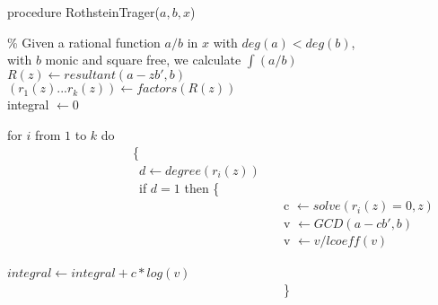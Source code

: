 \begin{flushleft}
procedure RothsteinTrager($a,b,x$)

\% Given a rational function $a/b$ in $x$ with $deg(a)<deg(b)$, \\
with $b$ monic and square free, we calculate $\int(a/b)$ \\
$R(z) \leftarrow resultant(a-zb',b)$ \\
$(r_{1}(z)...r_{k}(z)) \leftarrow factors(R(z))$ \\
integral $\leftarrow 0$

for $i$ from $1$ to $k$ do \\
~~~~~~~~~~~~~~~~~~~~\{ \\
~~~~~~~~~~~~~~~~~~~~~$ d \leftarrow degree(r_{i}(z))$ \\
~~~~~~~~~~~~~~~~~~~~~if $d=1$ then \{ \\
~~~~~~~~~~~~~~~~~~~~~~~~~~~~~~~~~~~~~~~~~~~~c $\leftarrow solve(r_{i}(z)=0,z)$ \\
~~~~~~~~~~~~~~~~~~~~~~~~~~~~~~~~~~~~~~~~~~~~v $\leftarrow GCD(a-cb',b)$ \\
~~~~~~~~~~~~~~~~~~~~~~~~~~~~~~~~~~~~~~~~~~~~v $\leftarrow v/lcoeff(v)$ \\

~~~~~~~~~~~~~~~~~~~~~~~~~~~~~~~~~~~~~~~~~~~~$integral \leftarrow integral+c*log(v)$ \\
~~~~~~~~~~~~~~~~~~~~~~~~~~~~~~~~~~~~~~~~~~~~\} \\


\end{flushleft}
